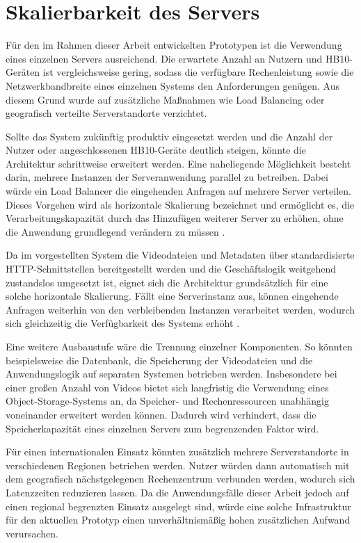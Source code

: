 \section{Skalierbarkeit des Servers} 

Für den im Rahmen dieser Arbeit entwickelten Prototypen ist die Verwendung eines einzelnen Servers ausreichend. Die erwartete Anzahl an Nutzern und HB10-Geräten ist vergleichsweise gering, sodass die verfügbare Rechenleistung sowie die Netzwerkbandbreite eines einzelnen Systems den Anforderungen genügen. 
Aus diesem Grund wurde auf zusätzliche Maßnahmen wie Load Balancing oder geografisch verteilte Serverstandorte verzichtet. 

Sollte das System zukünftig produktiv eingesetzt werden und die Anzahl der Nutzer oder angeschlossenen HB10-Geräte deutlich steigen, könnte die Architektur schrittweise erweitert werden. Eine naheliegende Möglichkeit besteht darin, mehrere Instanzen der Serveranwendung parallel zu betreiben. 
Dabei würde ein Load Balancer die eingehenden Anfragen auf mehrere Server verteilen. Dieses Vorgehen wird als horizontale Skalierung bezeichnet und ermöglicht es, die Verarbeitungskapazität durch das Hinzufügen weiterer Server zu erhöhen, ohne die Anwendung grundlegend verändern zu müssen \cite{Al-Dulaimy2024}. 

Da im vorgestellten System die Videodateien und Metadaten über standardisierte HTTP-Schnittstellen bereitgestellt werden und die Geschäftslogik weitgehend zustandslos umgesetzt ist, eignet sich die Architektur grundsätzlich für eine solche horizontale Skalierung. Fällt eine Serverinstanz aus, 
können eingehende Anfragen weiterhin von den verbleibenden Instanzen verarbeitet werden, wodurch sich gleichzeitig die Verfügbarkeit des Systems erhöht \cite{Smirnov2025}. 

Eine weitere Ausbaustufe wäre die Trennung einzelner Komponenten. So könnten beispielsweise die Datenbank, die Speicherung der Videodateien und die Anwendungslogik auf separaten Systemen betrieben werden. Insbesondere bei einer großen Anzahl von Videos 
bietet sich langfristig die Verwendung eines Object-Storage-Systems an, da Speicher- und Rechenressourcen unabhängig voneinander erweitert werden können. Dadurch wird verhindert, dass die Speicherkapazität eines einzelnen Servers zum begrenzenden Faktor wird. 

Für einen internationalen Einsatz könnten zusätzlich mehrere Serverstandorte in verschiedenen Regionen betrieben werden. Nutzer würden dann automatisch mit dem geografisch nächstgelegenen Rechenzentrum verbunden werden, wodurch sich Latenzzeiten reduzieren lassen. 
Da die Anwendungsfälle dieser Arbeit jedoch auf einen regional begrenzten Einsatz ausgelegt sind, würde eine solche Infrastruktur für den aktuellen Prototyp einen unverhältnismäßig hohen zusätzlichen Aufwand verursachen. 

